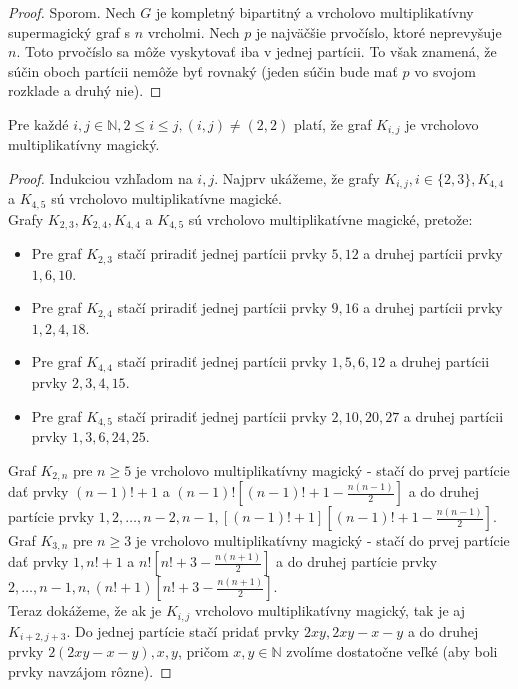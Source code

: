 \begin{proof} Sporom. Nech $G$ je kompletný bipartitný a vrcholovo multiplikatívny supermagický graf s $n$ vrcholmi. Nech $p$ je najväčšie prvočíslo, ktoré neprevyšuje $n$. Toto prvočíslo sa môže vyskytovať iba v jednej partícii. To však znamená, že súčin oboch partícii nemôže byť rovnaký (jeden súčin bude mať $p$ vo svojom rozklade a druhý nie).
\end{proof}

\begin{theorem}
\label{vmmgkij}
Pre každé $i,j \in \mathbb{N}, 2 \leq i \leq j, (i, j) \neq (2, 2)$ platí, že graf $K_{i,j}$ je vrcholovo multiplikatívny magický.
\end{theorem}

\begin{proof} Indukciou vzhľadom na $i,j$. Najprv ukážeme, že grafy $K_{i,j}, i \in \{2,3\}, K_{4,4}$ a $K_{4,5}$ sú vrcholovo multiplikatívne magické. \\

Grafy $K_{2,3}, K_{2,4}, K_{4,4}$ a $K_{4,5}$ sú vrcholovo multiplikatívne magické, pretože:
\begin{itemize}
\item Pre graf $K_{2,3}$ stačí priradiť jednej partícii prvky $5, 12$ a druhej partícii prvky $1, 6, 10$.
\item Pre graf $K_{2,4}$ stačí priradiť jednej partícii prvky $9, 16$ a druhej partícii prvky $1, 2, 4, 18$.
\item Pre graf $K_{4,4}$ stačí priradiť jednej partícii prvky $1, 5, 6, 12$ a druhej partícii prvky $2, 3, 4, 15$.
\item Pre graf $K_{4,5}$ stačí priradiť jednej partícii prvky $2, 10, 20, 27$ a druhej partícii prvky $1, 3, 6, 24, 25$.
\end{itemize}

Graf $K_{2,n}$ pre $n \geq 5$ je vrcholovo multiplikatívny magický - stačí do prvej partície dať prvky $(n-1)! + 1$ a $(n-1)! [(n-1)! + 1 - \frac{n(n-1)}{2}]$ a do druhej partície prvky $1, 2, \dots , n-2, n-1, [(n-1)! + 1] [(n-1)! + 1 - \frac{n(n-1)}{2}]$. \\

Graf $K_{3,n}$ pre $n \geq 3$ je vrcholovo multiplikatívny magický - stačí do prvej partície dať prvky $1, n! + 1$ a $n! [n! + 3 - \frac{n(n+1)}{2}]$ a do druhej partície prvky $2, \dots , n-1, n, (n! + 1) [n! + 3 - \frac{n(n+1)}{2}]$. \\

Teraz dokážeme, že ak je $K_{i,j}$ vrcholovo multiplikatívny magický, tak je aj $K_{i+2,j+3}$. Do jednej partície stačí pridať prvky $2xy, 2xy - x - y$ a do druhej prvky $2(2xy - x - y), x, y$, pričom $x,y \in \mathbb{N}$ zvolíme dostatočne veľké (aby boli prvky navzájom rôzne).
\end{proof}



